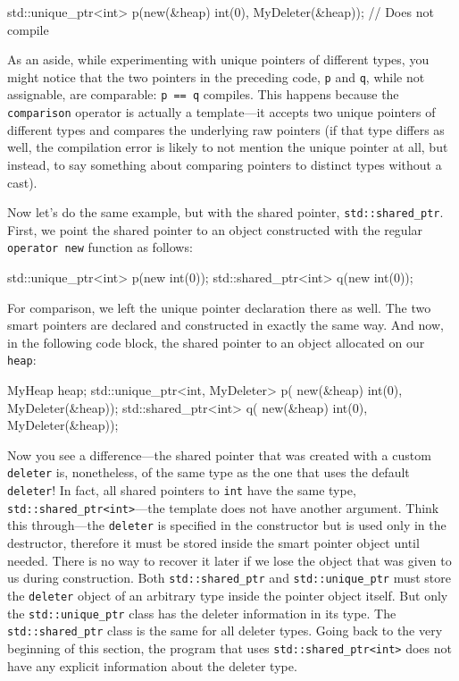 \begin{code}
std::unique_ptr<int> p(new(&heap) int(0),
  MyDeleter(&heap));    // Does not compile
\end{code}

As an aside, while experimenting with unique pointers of different types, you might notice that the two pointers in the preceding code, \texttt{p} and \texttt{q}, while not assignable, are comparable: \texttt{p\ ==\ q} compiles. This happens because the \texttt{comparison} operator is actually a template---it accepts two unique pointers of different types and compares the underlying raw pointers (if that type differs as well, the compilation error is likely to not mention the unique pointer at all, but instead, to say something about comparing pointers to distinct types without a cast).

Now let's do the same example, but with the shared pointer, \texttt{std::shared\_ptr}. First, we point the shared pointer to an object constructed with the regular \texttt{operator\ new} function as follows:

\begin{code}
std::unique_ptr<int> p(new int(0));
std::shared_ptr<int> q(new int(0));
\end{code}

For comparison, we left the unique pointer declaration there as well. The two smart pointers are declared and constructed in exactly the same way. And now, in the following code block, the shared pointer to an object allocated on our \texttt{heap}:

\begin{code}
MyHeap heap;
std::unique_ptr<int, MyDeleter> p(
  new(&heap) int(0), MyDeleter(&heap));
std::shared_ptr<int> q(
  new(&heap) int(0), MyDeleter(&heap));
\end{code}

Now you see a difference---the shared pointer that was created with a custom \texttt{deleter} is, nonetheless, of the same type as the one that uses the default \texttt{deleter}! In fact, all shared pointers to \texttt{int} have the same type, \texttt{std::shared\_ptr\textless{}int\textgreater{}}---the template does not have another argument. Think this through---the \texttt{deleter} is specified in the constructor but is used only in the destructor, therefore it must be stored inside the smart pointer object until needed. There is no way to recover it later if we lose the object that was given to us during construction. Both \texttt{std::shared\_ptr} and \texttt{std::unique\_ptr} must store the \texttt{deleter} object of an arbitrary type inside the pointer object itself. But only the \texttt{std::unique\_ptr} class has the deleter information in its type. The \texttt{std::shared\_ptr} class is the same for all deleter types. Going back to the very beginning of this section, the program that uses \texttt{std::shared\_ptr\textless{}int\textgreater{}} does not have any explicit information about the deleter type.


